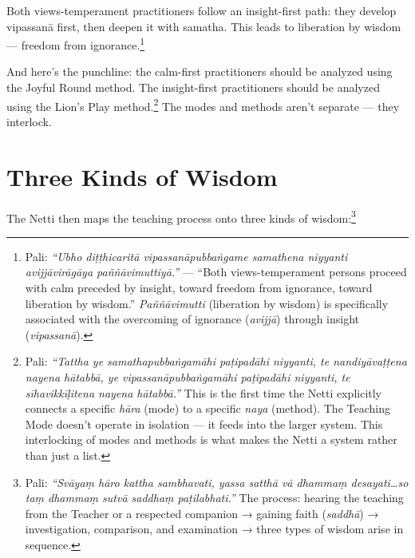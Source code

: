 Both views-temperament practitioners follow an insight-first path: they develop vipassanā first, then deepen it with samatha. This leads to liberation by wisdom --- freedom from ignorance.\footnote{Pali: \textit{``Ubho diṭṭhicaritā vipassanāpubbaṅgame samathena niyyanti avijjāvirāgāya paññāvimuttiyā.''} --- ``Both views-temperament persons proceed with calm preceded by insight, toward freedom from ignorance, toward liberation by wisdom.'' \textit{Paññāvimutti} (liberation by wisdom) is specifically associated with the overcoming of ignorance (\textit{avijjā}) through insight (\textit{vipassanā}).}

And here's the punchline: the calm-first practitioners should be analyzed using the Joyful Round method. The insight-first practitioners should be analyzed using the Lion's Play method.\footnote{Pali: \textit{``Tattha ye samathapubbaṅgamāhi paṭipadāhi niyyanti, te nandiyāvaṭṭena nayena hātabbā, ye vipassanāpubbaṅgamāhi paṭipadāhi niyyanti, te sīhavikkīḷitena nayena hātabbā.''} This is the first time the Netti explicitly connects a specific \textit{hāra} (mode) to a specific \textit{naya} (method). The Teaching Mode doesn't operate in isolation --- it feeds into the larger system. This interlocking of modes and methods is what makes the Netti a system rather than just a list.} The modes and methods aren't separate --- they interlock.

\section*{Three Kinds of Wisdom}

The Netti then maps the teaching process onto three kinds of wisdom:\footnote{Pali: \textit{``Svāyaṃ hāro kattha sambhavati, yassa satthā vā dhammaṃ desayati\ldots so taṃ dhammaṃ sutvā saddhaṃ paṭilabhati.''} The process: hearing the teaching from the Teacher or a respected companion → gaining faith (\textit{saddhā}) → investigation, comparison, and examination → three types of wisdom arise in sequence.}

